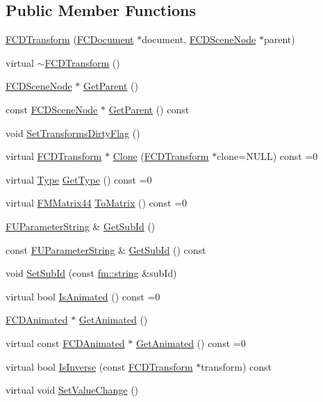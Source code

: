 \subsection*{Public Member Functions}
\begin{DoxyCompactItemize}
\item 
\hyperlink{classFCDTransform_a18daaaf8c64578eeebdaa5e5e09c6b66}{FCDTransform} (\hyperlink{classFCDocument}{FCDocument} $\ast$document, \hyperlink{classFCDSceneNode}{FCDSceneNode} $\ast$parent)
\item 
virtual \hyperlink{classFCDTransform_a8d472d99e748b80c9829b44eb7b7934d}{$\sim$FCDTransform} ()
\item 
\hyperlink{classFCDSceneNode}{FCDSceneNode} $\ast$ \hyperlink{classFCDTransform_a3da9bedb5a4ff62df3ffe10672a34e0a}{GetParent} ()
\item 
const \hyperlink{classFCDSceneNode}{FCDSceneNode} $\ast$ \hyperlink{classFCDTransform_a75778e4996553320c274a21cc120014b}{GetParent} () const 
\item 
void \hyperlink{classFCDTransform_a5fe09604c4a2b46a4576879ffb1aa18e}{SetTransformsDirtyFlag} ()
\item 
virtual \hyperlink{classFCDTransform}{FCDTransform} $\ast$ \hyperlink{classFCDTransform_a5ffc20180fb422a2756e1394576f2901}{Clone} (\hyperlink{classFCDTransform}{FCDTransform} $\ast$clone=NULL) const =0
\item 
virtual \hyperlink{classFCDTransform_a13e561c5e53aeaf84dedf4661cdc8921}{Type} \hyperlink{classFCDTransform_af406aebcba6215ebc1358a3cf87ab29d}{GetType} () const =0
\item 
virtual \hyperlink{classFMMatrix44}{FMMatrix44} \hyperlink{classFCDTransform_afd7fc3c7dc012782ebb2886c5bc13d01}{ToMatrix} () const =0
\item 
\hyperlink{classFUParameterT}{FUParameterString} \& \hyperlink{classFCDTransform_abfcbc0c1b44eb541d56fd2919bbb7d7d}{GetSubId} ()
\item 
const \hyperlink{classFUParameterT}{FUParameterString} \& \hyperlink{classFCDTransform_a945ce2cb0c895d720634ccedcfcc750c}{GetSubId} () const 
\item 
void \hyperlink{classFCDTransform_a063d8d592abd3d48d5d2e8baee56c2eb}{SetSubId} (const \hyperlink{classfm_1_1stringT}{fm::string} \&subId)
\item 
virtual bool \hyperlink{classFCDTransform_ab12ac63fa2d46fbcf8c025971635cda4}{IsAnimated} () const =0
\item 
\hyperlink{classFCDAnimated}{FCDAnimated} $\ast$ \hyperlink{classFCDTransform_afefc850b24274c7e3ced421b18bec24b}{GetAnimated} ()
\item 
virtual const \hyperlink{classFCDAnimated}{FCDAnimated} $\ast$ \hyperlink{classFCDTransform_aac1ff2df9e63702a90300ba9c38c48e1}{GetAnimated} () const =0
\item 
virtual bool \hyperlink{classFCDTransform_a9fa1a02a51f833f819248c2ff020507c}{IsInverse} (const \hyperlink{classFCDTransform}{FCDTransform} $\ast$transform) const 
\item 
virtual void \hyperlink{classFCDTransform_adb72479a86149a1f93a3dfdf84569b91}{SetValueChange} ()
\end{DoxyCompactItemize}


